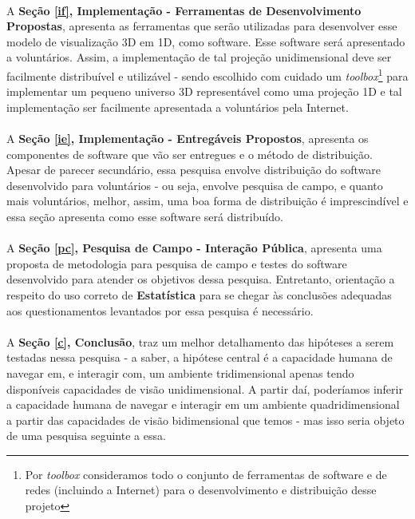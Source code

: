 \documentclass{article}
\begin{document}
	\paragraph{}
	A \textbf{Seção \ref{if}, Implementação - Ferramentas de Desenvolvimento Propostas}, apresenta as ferramentas que serão utilizadas para desenvolver esse modelo de visualização 3D em 1D, como software. Esse software será apresentado a voluntários. Assim, a implementação de tal projeção unidimensional deve ser facilmente distribuível e utilizável - sendo escolhido com cuidado um \textit{toolbox}\footnote{Por \textit{toolbox} consideramos todo o conjunto de ferramentas de software e de redes (incluindo a Internet) para o desenvolvimento e distribuição desse projeto} para implementar um pequeno universo 3D representável como uma projeção 1D e tal implementação ser facilmente apresentada a voluntários pela Internet.
	
	\paragraph{}
	A \textbf{Seção \ref{ie}, Implementação - Entregáveis Propostos}, apresenta os componentes de software que vão ser entregues e o método de distribuição. Apesar de parecer secundário, essa pesquisa envolve distribuição do software desenvolvido para voluntários - ou seja, envolve pesquisa de campo, e quanto mais voluntários, melhor, assim, uma boa forma de distribuição é imprescindível e essa seção apresenta como esse software será distribuído.
	
	\paragraph{}
	A \textbf{Seção \ref{pc}, Pesquisa de Campo - Interação Pública}, apresenta uma proposta de metodologia para pesquisa de campo e testes do software desenvolvido para atender os objetivos dessa pesquisa. Entretanto, orientação a respeito do uso correto de \textbf{Estatística} para se chegar às conclusões adequadas aos questionamentos levantados por essa pesquisa é necessário.
	
	\paragraph{}
	A \textbf{Seção \ref{c}, Conclusão}, traz um melhor detalhamento das hipóteses a serem testadas nessa pesquisa - a saber, a hipótese central é a capacidade humana de navegar em, e interagir com, um ambiente tridimensional apenas tendo disponíveis capacidades de visão unidimensional. A partir daí, poderíamos inferir a capacidade humana de navegar e interagir em um ambiente quadridimensional a partir das capacidades de visão bidimensional que temos - mas isso seria objeto de uma pesquisa seguinte a essa.
		
\end{document}
